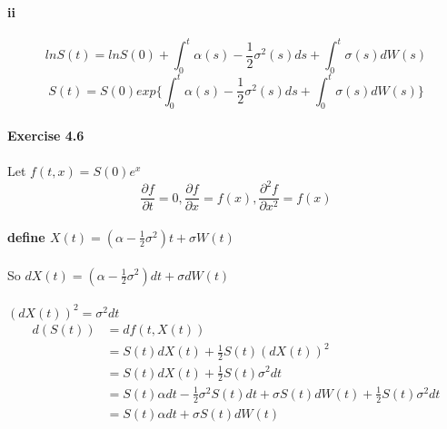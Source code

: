 \documentclass{article}
\begin{document}
\paragraph{ii}
\begin{displaymath}
  lnS(t)=lnS(0)+\int_{0}^{t}\alpha(s)-\frac{1}{2}\sigma^2(s)ds+\int_{0}^{t}\sigma(s)dW(s)
\end{displaymath}
\begin{displaymath}
  S(t)=S(0)exp\{\int_{0}^{t}\alpha(s)-\frac{1}{2}\sigma^2(s)ds+\int_{0}^{t}\sigma(s)dW(s)
  \}
\end{displaymath}
\paragraph{Exercise 4.6}
\paragraph{}{Let $f(t,x)=S(0)e^x$}
\begin{displaymath}
   \frac{\partial f}{\partial t}=0,\frac{\partial f}{\partial x}=f(x),\frac{\partial^2 f}{\partial x^2}=f(x)
\end{displaymath}
\paragraph{define $X(t)=(\alpha-\frac{1}{2}\sigma^2)t+\sigma W(t)$}
\paragraph{}{So $dX(t)=(\alpha-\frac{1}{2}\sigma^2)dt+\sigma dW(t)$}
\paragraph{}{$(dX(t))^2=\sigma^2dt$}
\begin{align*}
  d(S(t)) & =df(t,X(t)) \\
   &= S(t)dX(t)+\frac{1}{2}S(t)(dX(t))^2 \\
   &= S(t)dX(t)+\frac{1}{2}S(t)\sigma^2dt \\
   & =S(t)\alpha dt-\frac{1}{2}\sigma^2S(t)dt+\sigma S(t)dW(t)+\frac{1}{2}S(t)\sigma^2dt \\
   & =S(t)\alpha dt+\sigma S(t)dW(t)
\end{align*}
\end{document}
